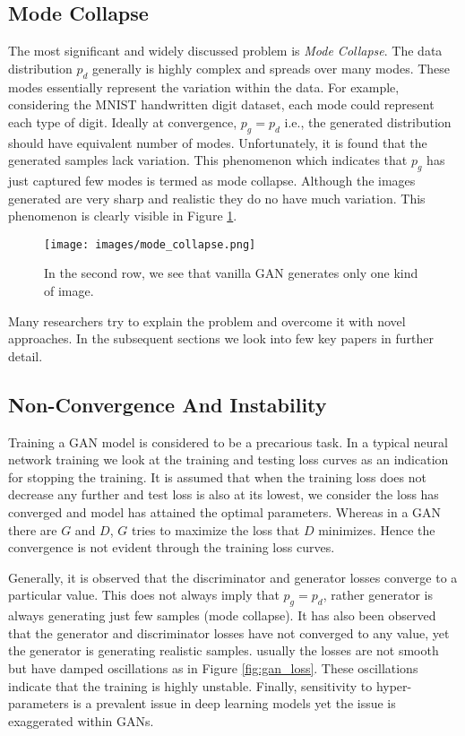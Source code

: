 \subsection{Mode Collapse}
\label{subsec:mc}
The most significant and widely discussed problem is \emph{Mode Collapse}. 
The data distribution $p_d$ generally is highly complex and spreads over many modes. These modes essentially represent the variation within the data. For example, considering the MNIST handwritten digit dataset, each mode could represent each type of digit. Ideally at convergence, $p_g = p_d$ i.e., the generated distribution should have equivalent number of modes. Unfortunately, it is found that the generated samples lack variation. This phenomenon which indicates that $p_g$ has just captured few modes is termed as mode collapse. Although the images generated are very sharp and realistic they do no have much variation. This phenomenon is clearly visible in Figure \ref{fig:modecollapse}. 
\begin{figure}
    \centering
    \texttt{[image: images/mode\_collapse.png]}
    \caption{ In the second row, we see that vanilla GAN generates only one kind of image.  \citep{unrolled}}
    \label{fig:modecollapse}
\end{figure}{}
Many researchers try to explain the problem and overcome it with novel approaches. In the subsequent sections we look into few key papers in further detail.


\subsection{Non-Convergence And Instability}
\label{subsec:nci}
Training a GAN model is considered to be a precarious task. In a typical neural network training we look at the training and testing loss curves as an indication for stopping the training. It is assumed that when the training loss does not decrease any further and test loss is also at its lowest, we consider the loss has converged and model has attained the optimal parameters. Whereas in a GAN there are $G$ and $D$, $G$ tries to maximize the loss that $D$ minimizes. Hence the convergence is not evident through the training loss curves. 

Generally, it is observed that the discriminator and generator losses converge to a particular value. This does not always imply that $p_g = p_d$, rather generator is always generating just few samples (mode collapse). It has also been observed that the generator and discriminator losses have not converged to any value, yet the generator is generating realistic samples. usually the losses are not smooth but have damped oscillations as in Figure \ref{fig:gan_loss}. These oscillations indicate that the training is highly unstable. Finally, sensitivity to hyper-parameters is a prevalent issue in deep learning models yet the issue is exaggerated within GANs.

